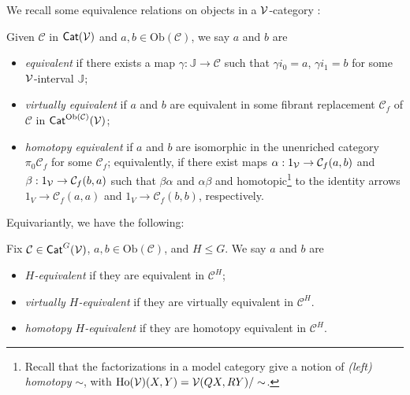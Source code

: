 \documentclass[a4paper,10pt
,draft
]{article}%
\newcommand{\J}{\mathbb J}
\renewcommand{\1}{\ensuremath{\mathbb{id}}}
\begin{document}
We recall some equivalence relations on objects in a $\mathcal V$-category \cite{Cav14, BM13}:
\begin{definition}
      Given $\mathcal{C}$ in  $\mathsf{Cat}(\mathcal V)$ and $a,b\in\mathrm{Ob}(\mathcal C)$, we say $a$ and $b$ are
      \begin{itemize}
      \item {\em equivalent} if there exists a map $\gamma: \J \to \mathcal C$ such that
            $\gamma i_0 = a$, $\gamma i_1 = b$
            for some $\mathcal V$-interval $\J$;
      \item {\em virtually equivalent} if $a$ and $b$ are equivalent in some fibrant replacement
            $\mathcal C_f$ of $\mathcal C$ in $\mathsf{Cat}^{\mathrm{Ob}(\mathcal C)}(\mathcal V)$;
      \item {\em homotopy equivalent} if $a$ and $b$ are isomorphic in the unenriched category $\pi_0 \mathcal C_f$
            for some $\mathcal C_f$;
            equivalently, if there exist maps
            $\alpha: 1_{\mathcal V} \to \mathcal C_f(a,b)$ and $\beta: 1_{\mathcal V}\to \mathcal C_f(b,a)$ such that
            $\beta\alpha$ and $\alpha\beta$ and homotopic\footnote{
              Recall that the factorizations in a model category give a notion of \textit{(left) homotopy} $\sim$,
              with $\operatorname{Ho}(\mathcal V)(X,Y) = \mathcal V(QX,RY)/\sim$.}
            to the identity arrows
            $1_V\to \mathcal C_f(a,a)$ and $1_V \to \mathcal C_f(b,b)$, respectively.
      \end{itemize}
\end{definition}

Equivariantly, we have the following:
\begin{definition}
      Fix $\mathcal{C}\in \mathsf{Cat}^G(\mathcal V)$, $a,b\in \mathrm{Ob}(\mathcal{C})$, and $H \leq G$.
      We say $a$ and $b$ are
      \begin{itemize}
      \item \textit{$H$-equivalent} if they are equivalent in $\mathcal{C}^H$;
      \item \textit{virtually $H$-equivalent } if
            they are virtually equivalent in $\mathcal C^H$.
      \item \textit{homotopy $H$-equivalent} if they are homotopy equivalent in $\mathcal{C}^H$.
      \end{itemize}
\end{definition}
\end{document}
